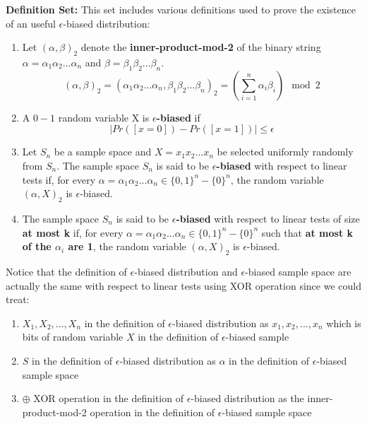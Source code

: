 \documentclass[a4paper, english]{paper}
\begin{document}
	\noindent\textbf{Definition Set:} This set includes various definitions used to prove the existence of an useful $\epsilon$-biased distribution:
	\begin{enumerate}
	\item Let $(\alpha,\beta)_2$ denote the \textbf{inner-product-mod-2} of the binary string $\alpha=\alpha_1\alpha_2...\alpha_n$ and $\beta=\beta_1\beta_2...\beta_n$.
	$$(\alpha,\beta)_2 =(\alpha_1\alpha_2...\alpha_n,\beta_1\beta_2...\beta_n)_2= (\sum_{i=1}^n \alpha_i\beta_i) \mod 2$$
	\item A $0-1$ random variable X is \textbf{$\epsilon$-biased} if
		$$|Pr([x=0])-Pr([x=1])|\le \epsilon$$
	\item Let $S_n$ be a sample space and $X=x_1x_2...x_n$ be selected uniformly randomly from $S_n$. The sample space $S_n$ is said to be \textbf{$\epsilon$-biased} with respect to linear tests if, for every $\alpha=\alpha_1\alpha_2...\alpha_n\in\{0,1\}^n-\{0\}^n$, the random variable $(\alpha,X)_2$ is $\epsilon$-biased.
	\item The sample space $S_n$ is said to be \textbf{$\epsilon$-biased} with respect to linear tests of size \textbf{at most k} if, for every $\alpha=\alpha_1\alpha_2...\alpha_n\in\{0,1\}^n-\{0\}^n$ such that \textbf{at most k of the $\alpha_i$ are 1}, the random variable $(\alpha,X)_2$ is $\epsilon$-biased.
	\end{enumerate}\par
	Notice that the definition of $\epsilon$-biased distribution and $\epsilon$-biased sample space are actually the same with respect to linear tests using XOR operation since we could treat:
	\begin{enumerate}
		\item $X_1,X_2,...,X_n$ in the definition of $\epsilon$-biased distribution as $x_1,x_2,...,x_n$ which is bits of random variable $X$ in the definition of $\epsilon$-biased sample
		\item $S$  in the definition of $\epsilon$-biased distribution as $\alpha$ in the definition of $\epsilon$-biased sample space
		\item $\oplus$ XOR operation in the definition of $\epsilon$-biased distribution as the inner-product-mod-2 operation in the definition of $\epsilon$-biased sample space
	\end{enumerate}
	
\end{document}
